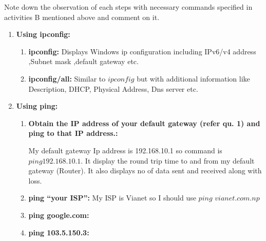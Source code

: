 \documentclass[a4paper,12pt]{article}
\begin{document}
\begin{Q}
    {Note down the observation of each steps with necessary commands specified in activities B
        mentioned above and comment on it.}
\end{Q}
\begin{enumerate}
    \item \textbf{Using ipconfig:}
          \begin{enumerate}
              \item \textbf{ipconfig:}
                    Displays Windows ip configuration including IPv6/v4 address ,Subnet mask ,default gateway etc.

              \item \textbf{ipconfig/all:} Similar to $ipconfig$ but with additional information like Description, DHCP, Physical Address, Dns server etc.


          \end{enumerate}

    \item \textbf{Using ping:}
          \begin{enumerate}
              \item \textbf{Obtain the IP address of your default gateway (refer qu. 1) and ping to that IP address.:}

                    My default gateway Ip address is 192.168.10.1 so command is  $ ping 192.168.10.1$.
                    It display the round trip time to and from my default gateway (Router). It also displays
                    no of data sent and received along with loss.


              \item \textbf{ping “your ISP”:}
                    My ISP is Vianet so I should use $ ping$ $vianet.com.np $


              \item \textbf{ping google.com:}

              \item \textbf{ping 103.5.150.3:}

          \end{enumerate}


\end{enumerate}
\end{document}
